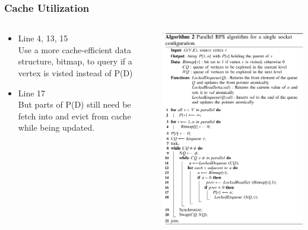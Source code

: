 \documentclass[]{beamer}
\begin{document}
\begin{frame}
  \frametitle{Cache Utilization}
  \begin{columns}
    \begin{column}{.5\textwidth}
      \begin{itemize}
        \item Line 4, 13, 15\\
          Use a more cache-efficient data structure, bitmap, to query if a vertex is visted instead of P(D)
        \item Line 17\\
          But parts of P(D) still need be fetch into and evict from cache while being updated.
      \end{itemize}
    \end{column}
    \begin{column}{.5\textwidth}
      \includegraphics[width=\textwidth]{figures/sc10-algo2}
    \end{column}
  \end{columns}
\end{frame}
\end{document}

